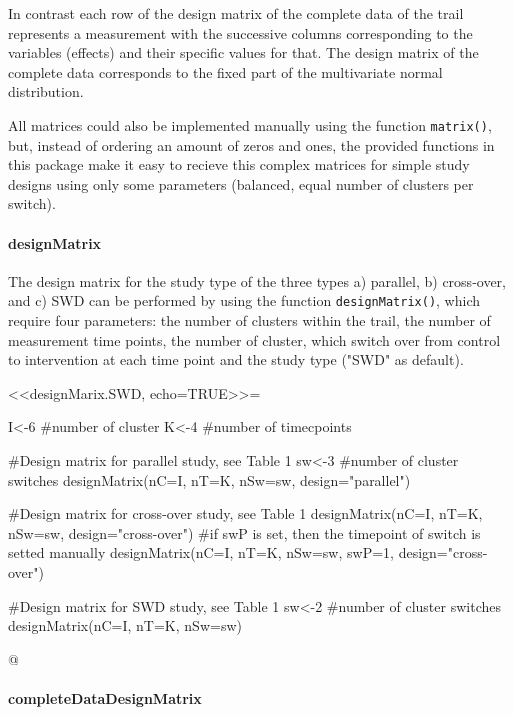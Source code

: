 \documentclass{article}
\newcommand{\Rfunction}[1]{{\texttt{#1}}}
\begin{document}
In contrast each row of the design matrix of the complete data of the trail represents a measurement with the successive columns corresponding to the variables (effects) and their specific values for that. The design matrix of the complete data corresponds to the fixed part of the multivariate normal distribution. 

All matrices could also be implemented manually using the function \Rfunction{matrix()}, but, instead of ordering an amount of zeros and ones, the provided functions in this package make it easy to recieve this complex matrices for simple study designs using only some parameters (balanced, equal number of clusters per switch).

\paragraph{designMatrix}

The design matrix for the study type of the three types a) parallel, b) cross-over, and c) SWD can be performed by using the function \Rfunction{designMatrix()}, which require four parameters: the number of clusters within the trail, the number of measurement time points, the number of cluster, which switch over from control to intervention at each time point and the study type ("SWD" as default).

<<designMarix.SWD, echo=TRUE>>=

I<-6 #number of cluster
K<-4  #number of  timecpoints

#Design matrix for parallel study, see Table 1
sw<-3 #number of cluster switches
designMatrix(nC=I, nT=K, nSw=sw, design="parallel")

#Design matrix for cross-over study, see Table 1
designMatrix(nC=I, nT=K, nSw=sw, design="cross-over")
#if swP is set, then the timepoint of switch is setted manually 
designMatrix(nC=I, nT=K, nSw=sw, swP=1, design="cross-over")

#Design matrix for SWD study, see Table 1
sw<-2 #number of cluster switches
designMatrix(nC=I, nT=K, nSw=sw)

@

\paragraph{completeDataDesignMatrix}
\end{document}
